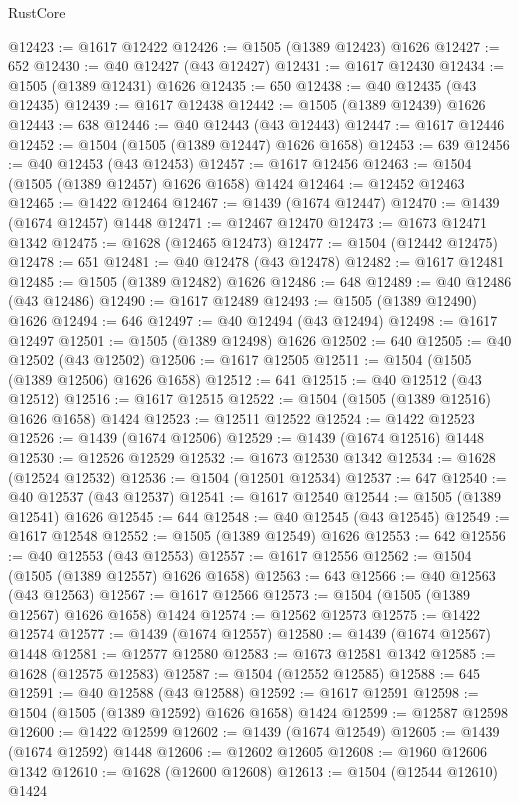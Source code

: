 \begin{lexlean}{RustCore}
\begin{coremodule}
@12423 := @1617 @12422
@12426 := @1505 (@1389 @12423) @1626
@12427 := 652
@12430 := @40 @12427 (@43 @12427)
@12431 := @1617 @12430
@12434 := @1505 (@1389 @12431) @1626
@12435 := 650
@12438 := @40 @12435 (@43 @12435)
@12439 := @1617 @12438
@12442 := @1505 (@1389 @12439) @1626
@12443 := 638
@12446 := @40 @12443 (@43 @12443)
@12447 := @1617 @12446
@12452 := @1504 (@1505 (@1389 @12447) @1626 @1658)
@12453 := 639
@12456 := @40 @12453 (@43 @12453)
@12457 := @1617 @12456
@12463 := @1504 (@1505 (@1389 @12457) @1626 @1658) @1424
@12464 := @12452 @12463
@12465 := @1422 @12464
@12467 := @1439 (@1674 @12447)
@12470 := @1439 (@1674 @12457) @1448
@12471 := @12467 @12470
@12473 := @1673 @12471 @1342
@12475 := @1628 (@12465 @12473)
@12477 := @1504 (@12442 @12475)
@12478 := 651
@12481 := @40 @12478 (@43 @12478)
@12482 := @1617 @12481
@12485 := @1505 (@1389 @12482) @1626
@12486 := 648
@12489 := @40 @12486 (@43 @12486)
@12490 := @1617 @12489
@12493 := @1505 (@1389 @12490) @1626
@12494 := 646
@12497 := @40 @12494 (@43 @12494)
@12498 := @1617 @12497
@12501 := @1505 (@1389 @12498) @1626
@12502 := 640
@12505 := @40 @12502 (@43 @12502)
@12506 := @1617 @12505
@12511 := @1504 (@1505 (@1389 @12506) @1626 @1658)
@12512 := 641
@12515 := @40 @12512 (@43 @12512)
@12516 := @1617 @12515
@12522 := @1504 (@1505 (@1389 @12516) @1626 @1658) @1424
@12523 := @12511 @12522
@12524 := @1422 @12523
@12526 := @1439 (@1674 @12506)
@12529 := @1439 (@1674 @12516) @1448
@12530 := @12526 @12529
@12532 := @1673 @12530 @1342
@12534 := @1628 (@12524 @12532)
@12536 := @1504 (@12501 @12534)
@12537 := 647
@12540 := @40 @12537 (@43 @12537)
@12541 := @1617 @12540
@12544 := @1505 (@1389 @12541) @1626
@12545 := 644
@12548 := @40 @12545 (@43 @12545)
@12549 := @1617 @12548
@12552 := @1505 (@1389 @12549) @1626
@12553 := 642
@12556 := @40 @12553 (@43 @12553)
@12557 := @1617 @12556
@12562 := @1504 (@1505 (@1389 @12557) @1626 @1658)
@12563 := 643
@12566 := @40 @12563 (@43 @12563)
@12567 := @1617 @12566
@12573 := @1504 (@1505 (@1389 @12567) @1626 @1658) @1424
@12574 := @12562 @12573
@12575 := @1422 @12574
@12577 := @1439 (@1674 @12557)
@12580 := @1439 (@1674 @12567) @1448
@12581 := @12577 @12580
@12583 := @1673 @12581 @1342
@12585 := @1628 (@12575 @12583)
@12587 := @1504 (@12552 @12585)
@12588 := 645
@12591 := @40 @12588 (@43 @12588)
@12592 := @1617 @12591
@12598 := @1504 (@1505 (@1389 @12592) @1626 @1658) @1424
@12599 := @12587 @12598
@12600 := @1422 @12599
@12602 := @1439 (@1674 @12549)
@12605 := @1439 (@1674 @12592) @1448
@12606 := @12602 @12605
@12608 := @1960 @12606 @1342
@12610 := @1628 (@12600 @12608)
@12613 := @1504 (@12544 @12610) @1424

\end{coremodule}
\end{lexlean}
